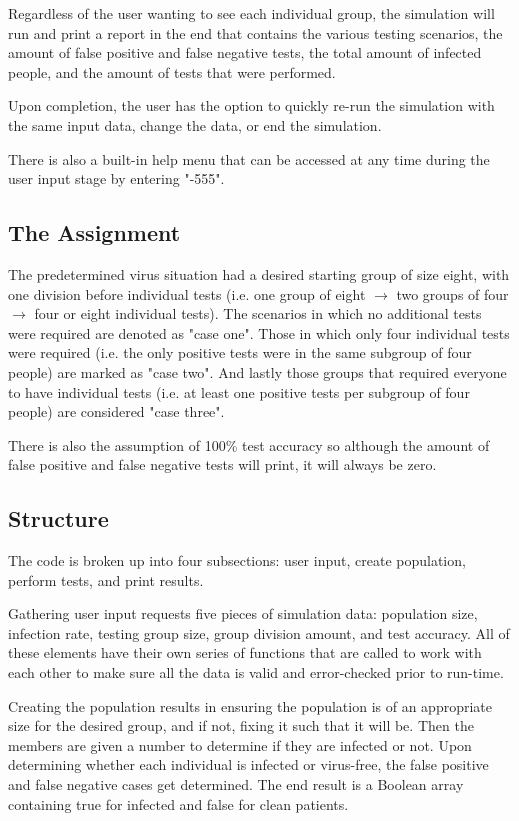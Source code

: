 \documentclass[letterpaper, 10pt,DIV=13]{scrartcl}
\numberwithin{equation}{section} %
\numberwithin{figure}{section} %
\numberwithin{table}{section} %
\begin{document}
Regardless of the user wanting to see each individual group, the simulation will run and print a report in the end that contains the various testing scenarios, the amount of false positive and false negative tests, the total amount of infected people, and the amount of tests that were performed.  

Upon completion, the user has the option to quickly re-run the simulation with the same input data, change the data, or end the simulation.

There is also a built-in help menu that can be accessed at any time during the user input stage by entering "-555".

\subsection{The Assignment}
The predetermined virus situation had a desired starting group of size eight, with one division before individual tests (i.e. one group of eight $\rightarrow$ two groups of four $\rightarrow$ four or eight individual tests).  The scenarios in which no additional tests were required are denoted as "case one".  Those in which only four individual tests were required (i.e. the only positive tests were in the same subgroup of four people) are marked as "case two".  And lastly those groups that required everyone to have individual tests (i.e. at least one positive tests per subgroup of four people) are considered "case three".

There is also the assumption of 100\% test accuracy so although the amount of false positive and false negative tests will print, it will always be zero.

\subsection{Structure}

The code is broken up into four subsections: user input, create population, perform tests, and print results.

Gathering user input requests five pieces of simulation data: population size, infection rate, testing group size, group division amount, and test accuracy.  All of these elements have their own series of functions that are called to work with each other to make sure all the data is valid and error-checked prior to run-time.   

Creating the population results in ensuring the population is of an appropriate size for the desired group, and if not, fixing it such that it will be.  Then the members are given a number to determine if they are infected or not. Upon determining whether each individual is infected or virus-free, the false positive and false negative cases get determined.  The end result is a Boolean array containing true for infected and false for clean patients.   
\end{document}
